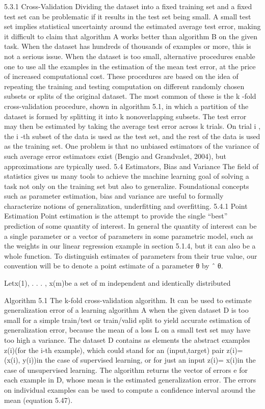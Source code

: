 \documentclass[11pt]{article}
\begin{document}
5.3.1 Cross-Validation
Dividing the dataset into a ﬁxed training set and a ﬁxed test set can be problematic
if it results in the test set being small.
A small test set implies statistical uncertainty
around the estimated average test error, making it diﬃcult to claim that algorithm
A works better than algorithm B on the given task.
When the dataset has hundreds of thousands of examples or more, this is not
a serious issue.
When the dataset is too small, alternative procedures enable one
to use all the examples in the estimation of the mean test error, at the price of
increased computational cost. These procedures are based on the idea of repeating
the training and testing computation on diﬀerent randomly chosen subsets or splits
of the original dataset. The most common of these is the
k
-fold cross-validation
procedure, shown in algorithm 5.1, in which a partition of the dataset is formed by
splitting it into
k
nonoverlapping subsets. The test error may then be estimated
by taking the average test error across
k
trials. On trial
i
, the
i
-th subset of the
data is used as the test set, and the rest of the data is used as the training set.
One problem is that no unbiased estimators of the variance of such average error
estimators exist (Bengio and Grandvalet, 2004), but approximations are typically
used.
5.4 Estimators, Bias and Variance
The ﬁeld of statistics gives us many tools to achieve the machine learning goal of
solving a task not only on the training set but also to generalize.
Foundational
concepts such as parameter estimation, bias and variance are useful to formally
characterize notions of generalization, underﬁtting and overﬁtting.
5.4.1 Point Estimation
Point estimation is the attempt to provide the single “best” prediction of some
quantity of interest.
In general the quantity of interest can be a single parameter
or a vector of parameters in some parametric model, such as the weights in our
linear regression example in section 5.1.4, but it can also be a whole function.
To distinguish estimates of parameters from their true value, our convention
will be to denote a point estimate of a parameter θ by
ˆ
θ.

Let{x(1), . . . , x(m)}be a set of m independent and identically distributed

Algorithm 5.1
The k-fold cross-validation algorithm.
It can be used to estimate generalization error of a learning algorithm A when the given dataset D is too small for a simple train/test or train/valid split to yield accurate estimation of generalization error, because the mean of a loss L on a small test set may have too high a variance.
The dataset D contains as elements the abstract examples z(i)(for the i-th example), which could stand for an (input,target) pair z(i)= (x(i), y(i))in the case of supervised learning, or for just an input
z(i)= x(i)in the case of unsupervised learning.
The algorithm returns the vector of errors e for each example in D, whose mean is the estimated generalization error.
The errors on individual examples can be used to compute a conﬁdence interval around the mean (equation 5.47).
\end{document}
